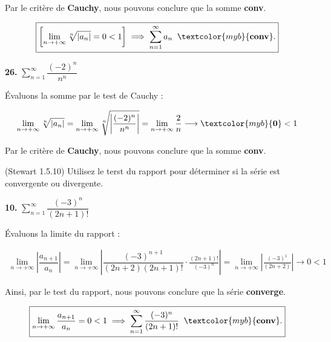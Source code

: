 \documentclass{report}
\begin{document}
    Par le critère de \textbf{Cauchy}, nous pouvons conclure que 
    la somme \textcolor{myb}{\textbf{conv}}. 

    \begin{align*}
    \boxed{
        \left[ 
        \lim\limits_{n \to+\infty } \sqrt[n]{|a_n|} = 0 < 1 
    \right] 
    \implies 
    \sum_{n=1}^{\infty }a_n \;\; \textcolor{myb}{\textbf{conv}}.
    }
    \end{align*}


    \vspace{1em}
    \noindent 
    \textbf{26.} $\sum_{n=1}^{\infty }\dfrac{(-2)^n}{n^n}$  


    Évaluons la somme par le test de Cauchy :

    \begin{align*}
        \lim\limits_{n \to+\infty }\sqrt[n]{|a_n|} 
        = 
        \lim\limits_{n \to+\infty } 
        \sqrt[n]{ \left| \dfrac{(-2)^n}{n^n} \right| } = 
        \lim\limits_{n \to+\infty } 
        \dfrac{2}{n} 
        \longrightarrow \textcolor{myb}{\textbf{0}} < 1  
    \end{align*}

    Par le critère de \textbf{Cauchy}, nous pouvons conclure que 
    la somme \textcolor{myb}{\textbf{conv}}. 

    \begin{Exercice}{(Stewart 1.5.10)}{}
        Utilisez le terst du rapport pour déterminer si la série est convergente ou 
        divergente.
    \end{Exercice}

    \vspace{1em} 
    \noindent
    \textbf{10.} $\sum_{n=1}^{\infty }\dfrac{(-3)^n}{(2n + 1)!}$

    Évaluons la limite du rapport :

    \begin{align*}
        \lim\limits_{n \to+\infty } \left|\dfrac{a_{n+1}}{a_n}\right|  =  
        \lim\limits_{n \to+\infty } 
        \left|
        \dfrac{(-3)^{n+1}}{(2n + 2)(2n +1)!} \cdot \frac{(2n +1)!}{(-3)^n} 
        \right|
        = 
        \lim\limits_{n \to+\infty }  
        \left|
        \frac{(-3)^1}{(2n + 2)} 
        \right|
        \longrightarrow 0 < 1 
    \end{align*}

    Ainsi, par le test du rapport, nous pouvons conclure que la série \textbf{converge}. 

    \begin{align*}
        \boxed{
        \lim\limits_{n \to+\infty }\frac{a_{n+1}}{a_n}  = 0 < 1 
        \implies \sum_{n=1}^{\infty }\dfrac{(-3)^n}{(2n + 1)!} \;\; \textcolor{myb}{\textbf{conv}}. 
    }
    \end{align*}    
    
\end{document}
